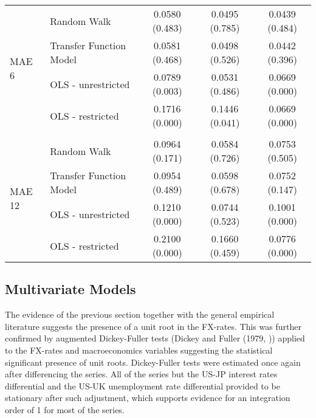 \begin{table}[!h]
\begin{tabular}{llccc}
    \\
    \multirow{4}{*}{MAE 6}        & \multicolumn{1}{l}{Random Walk}             &   0.0580 (0.483) & 0.0495 (0.785) & 0.0439 (0.484)\\
                                  & \multicolumn{1}{l}{Transfer Function Model} &   0.0581 (0.468) & 0.0498 (0.526) & 0.0442 (0.396)\\
                                  & \multicolumn{1}{l}{OLS - unrestricted}      &   0.0789 (0.003) & 0.0531 (0.486) & 0.0669 (0.000)\\
                                  & \multicolumn{1}{l}{OLS - restricted}        &   0.1716 (0.000) & 0.1446 (0.041) & 0.0669 (0.000)\\
     \\
    \multirow{4}{*}{MAE 12}       & \multicolumn{1}{l}{Random Walk}             &   0.0964 (0.171) & 0.0584 (0.726) & 0.0753 (0.505)\\
                                  & \multicolumn{1}{l}{Transfer Function Model} &   0.0954 (0.489) & 0.0598 (0.678) & 0.0752 (0.147)\\
                                  & \multicolumn{1}{l}{OLS - unrestricted}      &   0.1210 (0.000) & 0.0744 (0.523) & 0.1001 (0.000)\\
                                  & \multicolumn{1}{l}{OLS - restricted}        &   0.2100 (0.000) & 0.1660 (0.459) & 0.0776 (0.000)\\

    \bottomrule
  \end{tabular}
\label{table:MAEunivariate}
\end{table}


\subsection{Multivariate Models}

The evidence of the previous section together with the general empirical literature suggests the presence of a unit root in the
FX-rates. This was further confirmed by augmented Dickey-Fuller tests (Dickey and Fuller (1979, \cite{DickeyFuller}))
applied to the FX-rates and macroeconomics variables suggesting the statistical significant presence of unit roots.
Dickey-Fuller tests were estimated once again after differencing the series. All of the series but the US-JP interest rates
differential and the US-UK unemployment rate differential provided to be stationary after such adjustment, which supports evidence
for an integration order of 1 for most of the series.

